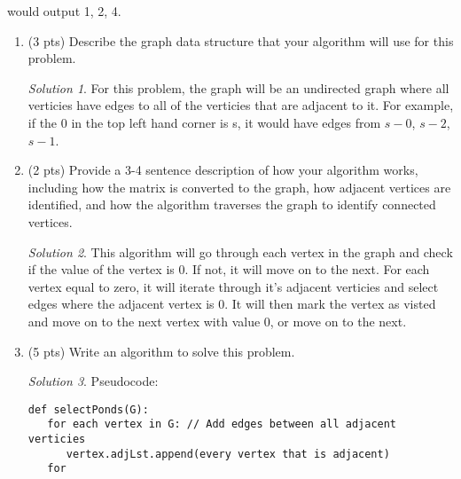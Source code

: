 \documentclass[12pt]{article}
\theoremstyle{remark}
\newtheorem*{solution}{Solution}
\begin{document}
\begin{enumerate}
would output 1, 2, 4.
\begin{enumerate}
    \item (3 pts) Describe the graph data structure that your algorithm will use for this problem.
    
    \begin{solution}
For this problem, the graph will be an undirected graph where all verticies have edges to all of the verticies that are adjacent to it. For example, if the 0 in the top left hand corner is s, it would have edges from $s-0$, $s-2$, $s-1$. 
    \end{solution}
\pagebreak
    
    \item (2 pts) Provide a 3-4 sentence description of how your algorithm works, including how the matrix is converted to the graph, how adjacent vertices are identified, and how the algorithm traverses the graph to identify connected vertices.
    
    \begin{solution}
This algorithm will go through each vertex in the graph and check if the value of the vertex is 0. If not, it will move on to the next. For each vertex equal to zero, it will iterate through it's adjacent verticies and select edges where the adjacent vertex is 0. It will then mark the vertex as visted and move on to the next vertex with value 0, or move on to the next.
    \end{solution}
    
    \item (5 pts) Write an algorithm to solve this problem. 
    
    \begin{solution}Pseudocode:
\begin{verbatim} 
def selectPonds(G):
   for each vertex in G: // Add edges between all adjacent verticies
      vertex.adjLst.append(every vertex that is adjacent)
   for 
   
\end{verbatim}
    \end{solution}
    
\end{enumerate}


\end{enumerate}
\end{document}

